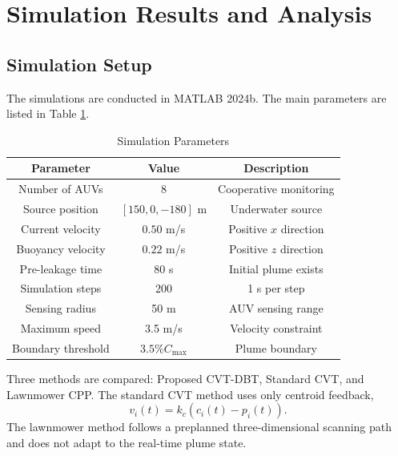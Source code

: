 \documentclass[conference]{IEEEtran}
\begin{document}
\section{Simulation Results and Analysis}
\subsection{Simulation Setup}
The simulations are conducted in MATLAB 2024b. The main parameters are listed in Table \ref{tab:params}.

\begin{table}[htbp]
\caption{Simulation Parameters}
\label{tab:params}
\begin{center}
\begin{tabular}{|c|c|c|}
\hline
\textbf{Parameter} & \textbf{Value} & \textbf{Description}\\
\hline
Number of AUVs & 8 & Cooperative monitoring\\
\hline
Source position & $[150,0,-180]$ m & Underwater source\\
\hline
Current velocity & $0.50$ m/s & Positive $x$ direction\\
\hline
Buoyancy velocity & $0.22$ m/s & Positive $z$ direction\\
\hline
Pre-leakage time & $80$ s & Initial plume exists\\
\hline
Simulation steps & 200 & 1 s per step\\
\hline
Sensing radius & 50 m & AUV sensing range\\
\hline
Maximum speed & 3.5 m/s & Velocity constraint\\
\hline
Boundary threshold & $3.5\%C_{\max}$ & Plume boundary\\
\hline
\end{tabular}
\end{center}
\end{table}

Three methods are compared: Proposed CVT-DBT, Standard CVT, and Lawnmower CPP. The standard CVT method uses only centroid feedback,
\begin{equation}
v_i(t)=k_c(c_i(t)-p_i(t)).
\end{equation}
The lawnmower method follows a preplanned three-dimensional scanning path and does not adapt to the real-time plume state.
\end{document}

